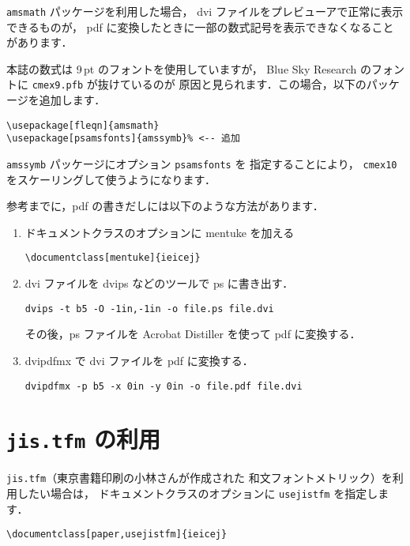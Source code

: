 \documentclass[technicalreport]{ieicej}
\begin{document}
\texttt{amsmath} パッケージを利用した場合，
dvi ファイルをプレビューアで正常に表示できるものが，
pdf に変換したときに一部の数式記号を表示できなくなることがあります．

本誌の数式は 9\,pt のフォントを使用していますが，
Blue Sky Research のフォントに \texttt{cmex9.pfb} が抜けているのが
原因と見られます．この場合，以下のパッケージを追加します．
\begin{verbatim}
\usepackage[fleqn]{amsmath}
\usepackage[psamsfonts]{amssymb}% <-- 追加
\end{verbatim}

\texttt{amssymb} パッケージにオプション \texttt{psamsfonts} を
指定することにより，
\texttt{cmex10} をスケーリングして使うようになります．
 
参考までに，pdf の書きだしには以下のような方法があります．
\begin{enumerate}
\item 
ドキュメントクラスのオプションに mentuke を加える
\begin{verbatim}
\documentclass[mentuke]{ieicej}
\end{verbatim}

\item
dvi ファイルを dvips などのツールで ps に書き出す．
\begin{verbatim}
dvips -t b5 -O -1in,-1in -o file.ps file.dvi
\end{verbatim}

その後，ps ファイルを Acrobat Distiller を使って pdf に変換する．

\item
dvipdfmx で dvi ファイルを pdf に変換する．
\begin{verbatim}
dvipdfmx -p b5 -x 0in -y 0in -o file.pdf file.dvi
\end{verbatim}
\end{enumerate}

\section{\texttt{jis.tfm} の利用}

\texttt{jis.tfm}（東京書籍印刷の小林さんが作成された
和文フォントメトリック）を利用したい場合は，
ドキュメントクラスのオプションに \texttt{usejistfm} を指定します．
\begin{verbatim}
\documentclass[paper,usejistfm]{ieicej}
\end{verbatim}
\end{document}
